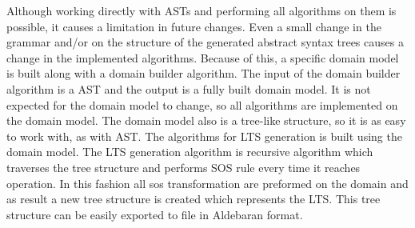 Although working directly with ASTs and performing all algorithms on them is possible, it causes 
a limitation in future changes. Even a small change in the grammar and/or on the structure of the
generated abstract syntax trees causes a change in the implemented algorithms. Because of this,
a specific domain model is built along with a domain builder algorithm. The input of the domain
builder algorithm is a AST and the output is a fully built domain model. It is not expected for 
the domain model to change, so all algorithms are implemented on the domain model. The domain
model also is a tree-like structure, so it is as easy to work with, as with AST. The algorithms 
for LTS generation is built using the domain model. The LTS generation algorithm is recursive
algorithm which traverses the tree structure and performs SOS rule every time it reaches operation.
In this fashion all sos transformation are preformed on the domain and as result a new tree
structure is created which represents the LTS. This tree structure can be easily exported to file
in Aldebaran format.